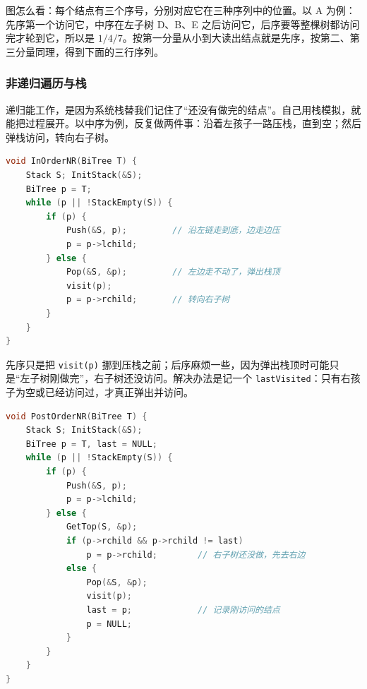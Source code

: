 图怎么看：每个结点有三个序号，分别对应它在三种序列中的位置。以 A 为例：先序第一个访问它，中序在左子树 D、B、E 之后访问它，后序要等整棵树都访问完才轮到它，所以是 $1/4/7$。按第一分量从小到大读出结点就是先序，按第二、第三分量同理，得到下面的三行序列。

\subsubsection{非递归遍历与栈}

递归能工作，是因为系统栈替我们记住了“还没有做完的结点”。自己用栈模拟，就能把过程展开。以中序为例，反复做两件事：沿着左孩子一路压栈，直到空；然后弹栈访问，转向右子树。

\begin{lstlisting}[language=C]
void InOrderNR(BiTree T) {
    Stack S; InitStack(&S);
    BiTree p = T;
    while (p || !StackEmpty(S)) {
        if (p) {
            Push(&S, p);         // 沿左链走到底，边走边压
            p = p->lchild;
        } else {
            Pop(&S, &p);         // 左边走不动了，弹出栈顶
            visit(p);
            p = p->rchild;       // 转向右子树
        }
    }
}
\end{lstlisting}

先序只是把 \texttt{visit(p)} 挪到压栈之前；后序麻烦一些，因为弹出栈顶时可能只是“左子树刚做完”，右子树还没访问。解决办法是记一个 \texttt{lastVisited}：只有右孩子为空或已经访问过，才真正弹出并访问。

\begin{lstlisting}[language=C]
void PostOrderNR(BiTree T) {
    Stack S; InitStack(&S);
    BiTree p = T, last = NULL;
    while (p || !StackEmpty(S)) {
        if (p) {
            Push(&S, p);
            p = p->lchild;
        } else {
            GetTop(S, &p);
            if (p->rchild && p->rchild != last)
                p = p->rchild;        // 右子树还没做，先去右边
            else {
                Pop(&S, &p);
                visit(p);
                last = p;             // 记录刚访问的结点
                p = NULL;
            }
        }
    }
}
\end{lstlisting}

